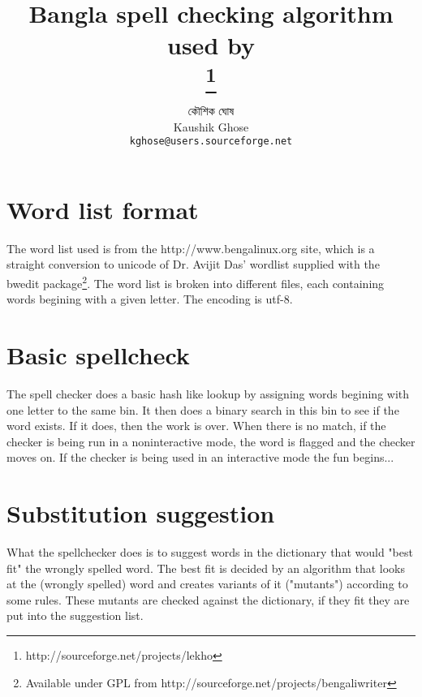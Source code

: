 \documentclass[11pt]{article}
\begin{document}
\title{Bangla spell checking algorithm used by\\ \footnote{http://sourceforge.net/projects/lekho}}
\author{ {\lbng কৌশিক ঘোষ}\\Kaushik Ghose\\{\tt kghose@users.sourceforge.net}}
\maketitle
\section{Word list format}
The word list used is from the http://www.bengalinux.org site, which is a straight conversion to unicode of Dr. Avijit Das' wordlist supplied with the bwedit package\footnote{Available under GPL from http://sourceforge.net/projects/bengaliwriter}. The word list is broken into different files, each containing words begining with a given letter. The encoding is utf-8.

\section{Basic spellcheck}
The spell checker does a basic hash like lookup by assigning words begining with one letter to the same bin. It then does a binary search in this bin to see if the word exists. If it does, then the work is over. When there is no match, if the checker is being run in a noninteractive mode, the word is flagged and the checker moves on. If the checker is being used in an interactive mode the fun begins... 

\section{Substitution suggestion}
What the spellchecker does is to suggest words in the dictionary that would "best fit" the wrongly spelled word. The best fit is decided by an algorithm that looks at the (wrongly spelled) word and creates variants of it ("mutants") according to some rules. These mutants are checked against the dictionary, if they fit they are put into the suggestion list.
\end{document}
